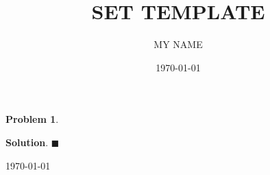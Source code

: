 \documentclass[letter,10pt]{article}
\title{SET TEMPLATE}  %
\author{MY NAME}  %
\date{\today}
\newtheorem{problem}{Problem}
\newenvironment{solution}{\begin{trivlist} \item \textbf{Solution}. }{ \hspace*{\fill} $\blacksquare$\end{trivlist}}
\begin{document}
\maketitle

\begin{problem}\label{p1}
\end{problem}

\begin{solution}
\end{solution}

\hfill \today 
\end{document}
